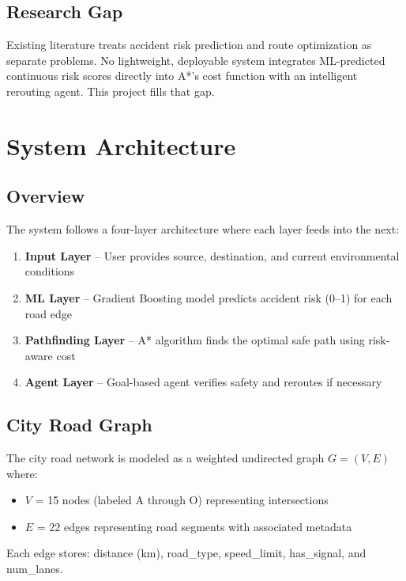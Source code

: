 \documentclass[12pt,a4paper]{report}
\begin{document}
\section{Research Gap}
Existing literature treats accident risk prediction and route optimization as separate problems. No lightweight, deployable system integrates ML-predicted continuous risk scores directly into A*'s cost function with an intelligent rerouting agent. This project fills that gap.

\chapter{System Architecture}

\section{Overview}
The system follows a four-layer architecture where each layer feeds into the next:

\begin{enumerate}
  \item \textbf{Input Layer} -- User provides source, destination, and current environmental conditions
  \item \textbf{ML Layer} -- Gradient Boosting model predicts accident risk (0--1) for each road edge
  \item \textbf{Pathfinding Layer} -- A* algorithm finds the optimal safe path using risk-aware cost
  \item \textbf{Agent Layer} -- Goal-based agent verifies safety and reroutes if necessary
\end{enumerate}

\section{City Road Graph}
The city road network is modeled as a weighted undirected graph $G = (V, E)$ where:
\begin{itemize}
  \item $V$ = 15 nodes (labeled A through O) representing intersections
  \item $E$ = 22 edges representing road segments with associated metadata
\end{itemize}

Each edge stores: distance (km), road\_type, speed\_limit, has\_signal, and num\_lanes.
\end{document}
